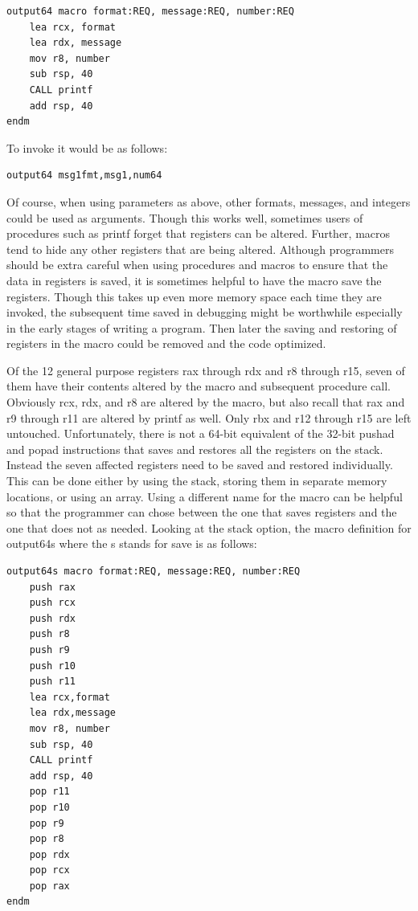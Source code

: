 \documentclass[10pt]{book}
\begin{document}
\begin{verbatim}
output64 macro format:REQ, message:REQ, number:REQ
    lea rcx, format
    lea rdx, message
    mov r8, number
    sub rsp, 40
    CALL printf
    add rsp, 40
endm
\end{verbatim}

To invoke it would be as follows:

\begin{verbatim}
output64 msg1fmt,msg1,num64
\end{verbatim}

Of course, when using parameters as above, other formats, messages, and integers could be used as arguments. Though this works well, sometimes users of procedures such as printf forget that registers can be altered. Further, macros tend to hide any other registers that are being altered. Although programmers should be extra careful when using procedures and macros to ensure that the data in registers is saved, it is sometimes helpful to have the macro save the registers. Though this takes up even more memory space each time they are invoked, the subsequent time saved in debugging might be worthwhile especially in the early stages of writing a program. Then later the saving and restoring of registers in the macro could be removed and the code optimized.

Of the 12 general purpose registers rax through rdx and r8 through r15, seven of them have their contents altered by the macro and subsequent procedure call. Obviously rcx, rdx, and r8 are altered by the macro, but also recall that rax and r9 through r11 are altered by printf as well. Only rbx and r12 through r15 are left untouched. Unfortunately, there is not a 64-bit equivalent of the 32-bit pushad and popad instructions that saves and restores all the registers on the stack. Instead the seven affected registers need to be saved and restored individually. This can be done either by using the stack, storing them in separate memory locations, or using an array. Using a different name for the macro can be helpful so that the programmer can chose between the one that saves registers and the one that does not as needed. Looking at the stack option, the macro definition for output64s where the s stands for save is as follows:

\begin{verbatim}
output64s macro format:REQ, message:REQ, number:REQ
    push rax
    push rcx
    push rdx
    push r8
    push r9
    push r10
    push r11
    lea rcx,format
    lea rdx,message
    mov r8, number
    sub rsp, 40
    CALL printf
    add rsp, 40
    pop r11
    pop r10
    pop r9
    pop r8
    pop rdx
    pop rcx
    pop rax
endm
\end{verbatim}
\end{document}
